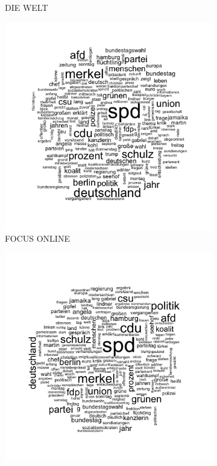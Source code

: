 \documentclass[12pt,a4paper,notitlepage]{article}
\begin{document}
\begin{figure}[H]
\begin{center}
\begin{subfigure}[normla]{0.3\textwidth}
			\caption{DIE WELT}
		\end{subfigure}
		\begin{subfigure}[normla]{0.3\textwidth}
			\includegraphics[width=\textwidth]{../figs/wordcloud_FOCUSONLINE.png}
			\caption{FOCUS ONLINE}
		\end{subfigure}
		\begin{subfigure}[normla]{0.3\textwidth}
			\includegraphics[width=\textwidth]{../figs/wordcloud_SPIEGELONLINE.png}

\end{subfigure}
\end{center}
\end{figure}
\end{document}
